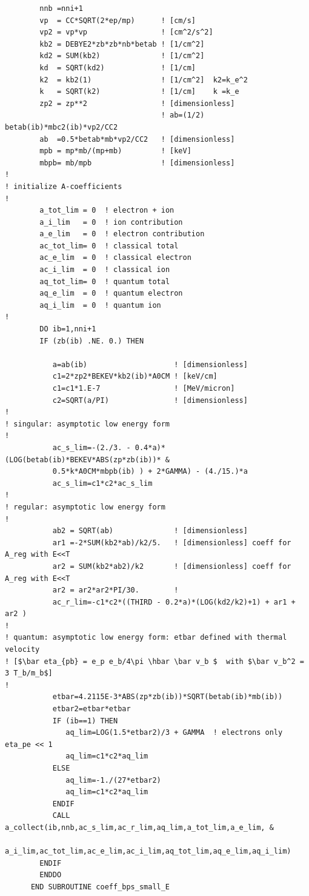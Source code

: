 \documentclass[preprint,12pt,eqsecnum,nofootinbib,amsmath,amssymb]{revtex4}
\begin{document}
{\begin{verbatim}
        nnb =nni+1
        vp  = CC*SQRT(2*ep/mp)      ! [cm/s]
        vp2 = vp*vp                 ! [cm^2/s^2]
        kb2 = DEBYE2*zb*zb*nb*betab ! [1/cm^2]
        kd2 = SUM(kb2)              ! [1/cm^2]
        kd  = SQRT(kd2)             ! [1/cm]
        k2  = kb2(1)                ! [1/cm^2]  k2=k_e^2
        k   = SQRT(k2)              ! [1/cm]    k =k_e
        zp2 = zp**2                 ! [dimensionless]
                                    ! ab=(1/2) betab(ib)*mbc2(ib)*vp2/CC2
        ab  =0.5*betab*mb*vp2/CC2   ! [dimensionless] 
        mpb = mp*mb/(mp+mb)         ! [keV]
        mbpb= mb/mpb                ! [dimensionless]
!
! initialize A-coefficients
!
        a_tot_lim = 0  ! electron + ion
        a_i_lim   = 0  ! ion contribution
        a_e_lim   = 0  ! electron contribution
        ac_tot_lim= 0  ! classical total
        ac_e_lim  = 0  ! classical electron
        ac_i_lim  = 0  ! classical ion
        aq_tot_lim= 0  ! quantum total
        aq_e_lim  = 0  ! quantum electron
        aq_i_lim  = 0  ! quantum ion
!
        DO ib=1,nni+1
        IF (zb(ib) .NE. 0.) THEN

           a=ab(ib)                    ! [dimensionless] 
           c1=2*zp2*BEKEV*kb2(ib)*A0CM ! [keV/cm]
           c1=c1*1.E-7                 ! [MeV/micron]
           c2=SQRT(a/PI)               ! [dimensionless] 
!
! singular: asymptotic low energy form
!
           ac_s_lim=-(2./3. - 0.4*a)*(LOG(betab(ib)*BEKEV*ABS(zp*zb(ib))* &
           0.5*k*A0CM*mbpb(ib) ) + 2*GAMMA) - (4./15.)*a
           ac_s_lim=c1*c2*ac_s_lim
!
! regular: asymptotic low energy form
!
           ab2 = SQRT(ab)              ! [dimensionless]
           ar1 =-2*SUM(kb2*ab)/k2/5.   ! [dimensionless] coeff for A_reg with E<<T
           ar2 = SUM(kb2*ab2)/k2       ! [dimensionless] coeff for A_reg with E<<T
           ar2 = ar2*ar2*PI/30.        !
           ac_r_lim=-c1*c2*((THIRD - 0.2*a)*(LOG(kd2/k2)+1) + ar1 + ar2 )
!
! quantum: asymptotic low energy form: etbar defined with thermal velocity
! [$\bar eta_{pb} = e_p e_b/4\pi \hbar \bar v_b $  with $\bar v_b^2 = 3 T_b/m_b$]
!
           etbar=4.2115E-3*ABS(zp*zb(ib))*SQRT(betab(ib)*mb(ib))
           etbar2=etbar*etbar
           IF (ib==1) THEN
              aq_lim=LOG(1.5*etbar2)/3 + GAMMA  ! electrons only eta_pe << 1
              aq_lim=c1*c2*aq_lim
           ELSE
              aq_lim=-1./(27*etbar2)
              aq_lim=c1*c2*aq_lim
           ENDIF
           CALL a_collect(ib,nnb,ac_s_lim,ac_r_lim,aq_lim,a_tot_lim,a_e_lim, &
             a_i_lim,ac_tot_lim,ac_e_lim,ac_i_lim,aq_tot_lim,aq_e_lim,aq_i_lim)
        ENDIF
        ENDDO
      END SUBROUTINE coeff_bps_small_E
\end{verbatim}
}
\end{document}
